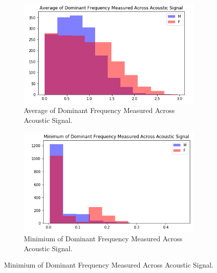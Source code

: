 \documentclass[12pt]{article}
\begin{document}
\pagebreak
\begin{figure}[h!]
	\centering
	\begin{subfigure}{0.49\linewidth}
		\centering
		\includegraphics[width=\linewidth]{images/hist_av_dfma.png}
		\caption{Average of Dominant Frequency Measured Across Acoustic Signal.}
		\label{fig:hist_av_dfma}
	\end{subfigure}
	\begin{subfigure}{0.49\linewidth}
		\centering
		\includegraphics[width=\linewidth]{images/hist_min_dfma.png}
		\caption{Minimium of Dominant Frequency Measured Across Acoustic Signal.}
		\label{fig:hist_min_dfma}
	\end{subfigure}
	\hfill
	

\end{figure}
\end{document}
